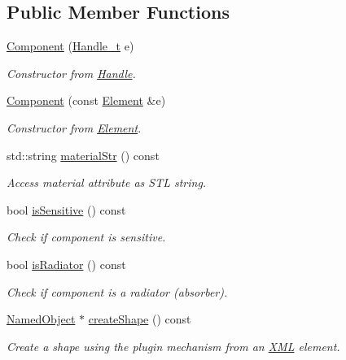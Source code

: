 \subsection*{Public Member Functions}
\begin{DoxyCompactItemize}
\item 
\hyperlink{struct_d_d4hep_1_1_x_m_l_1_1_component_aad3b73878abe65d69d7e53b4c2b043a0}{Component} (\hyperlink{class_d_d4hep_1_1_x_m_l_1_1_handle__t}{Handle\_\-t} e)
\begin{DoxyCompactList}\small\item\em Constructor from \hyperlink{class_d_d4hep_1_1_handle}{Handle}. \item\end{DoxyCompactList}\item 
\hyperlink{struct_d_d4hep_1_1_x_m_l_1_1_component_ab53e39ae951e177a0dc7e608611848a0}{Component} (const \hyperlink{class_d_d4hep_1_1_x_m_l_1_1_element}{Element} \&e)
\begin{DoxyCompactList}\small\item\em Constructor from \hyperlink{class_d_d4hep_1_1_x_m_l_1_1_element}{Element}. \item\end{DoxyCompactList}\item 
std::string \hyperlink{struct_d_d4hep_1_1_x_m_l_1_1_component_ae99125c89b1123ad870caf3fd5abe64b}{materialStr} () const 
\begin{DoxyCompactList}\small\item\em Access material attribute as STL string. \item\end{DoxyCompactList}\item 
bool \hyperlink{struct_d_d4hep_1_1_x_m_l_1_1_component_add2a9de5d5e29aca30402e080ae2ea44}{isSensitive} () const 
\begin{DoxyCompactList}\small\item\em Check if component is sensitive. \item\end{DoxyCompactList}\item 
bool \hyperlink{struct_d_d4hep_1_1_x_m_l_1_1_component_af904684407473701e1b9f1a895f80a15}{isRadiator} () const 
\begin{DoxyCompactList}\small\item\em Check if component is a radiator (absorber). \item\end{DoxyCompactList}\item 
\hyperlink{class_d_d4hep_1_1_named_object}{NamedObject} $\ast$ \hyperlink{struct_d_d4hep_1_1_x_m_l_1_1_component_a3725a2969dc1770e739ba3625bcd9a65}{createShape} () const 
\begin{DoxyCompactList}\small\item\em Create a shape using the plugin mechanism from an \hyperlink{namespace_d_d4hep_1_1_x_m_l}{XML} element. \item\end{DoxyCompactList}\end{DoxyCompactItemize}


